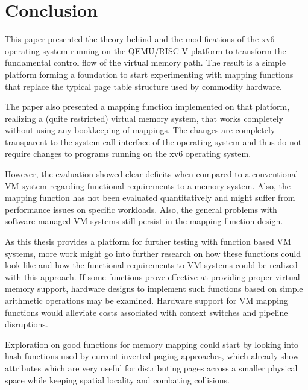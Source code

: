 \chapter{Conclusion}

\label{chap:conclusion}



This paper presented the theory behind and the modifications of the xv6 operating system running on the QEMU/RISC-V platform to transform the fundamental control flow of the virtual memory path. The result is a simple platform forming a foundation to start experimenting with mapping functions that replace the typical page table structure used by commodity hardware.

The paper also presented a mapping function implemented on that platform, realizing a (quite restricted) virtual memory system, that works completely without using any bookkeeping of mappings. The changes are completely transparent to the system call interface of the operating system and thus do not require changes to programs running on the xv6 operating system.

However, the evaluation showed clear deficits when compared to a conventional VM system regarding functional requirements to a memory system. Also, the mapping function has not been evaluated quantitatively and might suffer from performance issues on specific workloads. Also, the general problems with software-managed VM systems still persist in the mapping function design.

As this thesis provides a platform for further testing with function based VM systems, more work might go into further research on how these functions could look like and how the functional requirements to VM systems could be realized with this approach. If some functions prove effective at providing proper virtual memory support, hardware designs to implement such functions based on simple arithmetic operations may be examined. Hardware support for VM mapping functions would alleviate costs associated with context switches and pipeline disruptions.

Exploration on good functions for memory mapping could start by looking into hash functions used by current inverted paging approaches, which already show attributes which are very useful for distributing pages across a smaller physical space while keeping spatial locality and combating collisions.